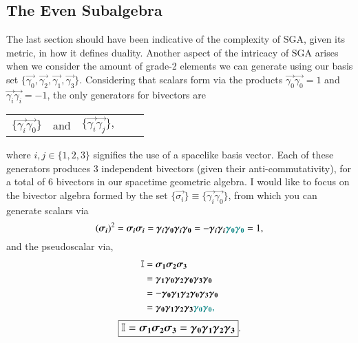 \subsection{The Even Subalgebra}
The last section should have been indicative of the complexity of SGA, given its metric, in how it defines duality. Another aspect of the intricacy of SGA arises when we consider the amount of grade-2 elements we can generate using our basis set $\{ \vec{\gamma_0}, \vec{\gamma_2}, \vec{\gamma_1}, \vec{\gamma_3} \}$. Considering that scalars form via the products $\vec{\gamma_0} \vec{\gamma_0} = 1$ and $\vec{\gamma_i}\vec{\gamma_i}= -1 $, the only generators for bivectors are 
\begin{table}[H]
\centering
\begin{tabular}{ccccc}
$\{\vec{\gamma_i}\vec{\gamma_0}\}$ & and & $\{\vec{\gamma_i} \vec{\gamma_j}\},$ 
\end{tabular}
\end{table}
where $i,j \in \{ 1,2,3\}$ signifies the use of a spacelike basis vector. Each of these generators produces 3 independent bivectors (given their anti-commutativity), for a total of 6 bivectors in our spacetime geometric algebra. I would like to focus on the bivector algebra formed by the set $ \{ \vec{\sigma_i} \} \equiv \{\vec{\gamma_i}\vec{\gamma_0}\}$, from which you can generate scalars via
\begin{equation} \label{eq:pauli_unitary}
    (\vec{\sigma_i})^2 = \vec{\sigma_i} \vec{\sigma_i}  =  \vec{\gamma_i} \vec{\gamma_0} \vec{\gamma_i} \vec{\gamma_0} = - \vec{\gamma_i} \vec{\gamma_i}  \color{teal} \vec{\gamma_0} \vec{\gamma_0} \color{black} = 1,
\end{equation}
and the pseudoscalar via,
\begin{align*}
    \mathbb{I} &=  \vec{\sigma_1} \vec{\sigma_2} \vec{\sigma_3} \\
    &= \vec{\gamma_1} \vec{\gamma_0} \vec{\gamma_2} \vec{\gamma_0} \vec{\gamma_3} \vec{\gamma_0} \\
    &=-\vec{\gamma_0} \vec{\gamma_1} \vec{\gamma_2} \vec{\gamma_0} \vec{\gamma_3} \vec{\gamma_0} \\
    &= \vec{\gamma_0} \vec{\gamma_1} \vec{\gamma_2} \vec{\gamma_3} \color{teal}\vec{\gamma_0} \vec{\gamma_0},
\end{align*}
\begin{equation}
    \large \boxed{ \mathbb{I} =  \vec{\sigma_1} \vec{\sigma_2} \vec{\sigma_3}=\vec{\gamma_0} \vec{\gamma_1} \vec{\gamma_2} \vec{\gamma_3}   }.
\end{equation}
